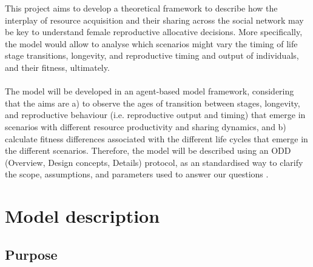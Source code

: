 \documentclass{article}
\begin{document}
This project aims to develop a theoretical framework to describe how the interplay of resource acquisition and their sharing across the social network may be key to understand female reproductive allocative decisions. More specifically, the model would allow to analyse which scenarios might vary the timing of life stage transitions, longevity, and reproductive timing and output of individuals, and their fitness, ultimately.
\\\\
The model will be developed in an agent-based model framework, considering that the aims are a) to observe the ages of transition between stages, longevity, and reproductive behaviour (i.e. reproductive output and timing) that emerge in scenarios with different resource productivity and sharing dynamics, and b) calculate fitness differences associated with the different life cycles that emerge in the different scenarios. Therefore, the model will be described using an ODD (Overview, Design concepts, Details) protocol, as an standardised way to clarify the scope, assumptions, and parameters used to answer our questions \citep{grimm2006standard,grimm2020odd}.

\section{Model description}

\subsection{Purpose}
\end{document}
